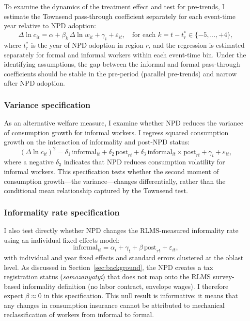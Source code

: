 \documentclass[12pt]{article}
\begin{document}
To examine the dynamics of the treatment effect and test for pre-trends, I estimate the Townsend pass-through coefficient separately for each event-time year relative to NPD adoption:
\begin{equation}\label{eq:eventstudy}
\Delta \ln c_{it} = \alpha + \beta_k \, \Delta \ln w_{it} + \gamma_t + \varepsilon_{it}, \quad \text{for each } k = t - t^*_r \in \{-5, \ldots, +4\},
\end{equation}
where $t^*_r$ is the year of NPD adoption in region $r$, and the regression is estimated separately for formal and informal workers within each event-time bin. Under the identifying assumptions, the gap between the informal and formal pass-through coefficients should be stable in the pre-period (parallel pre-trends) and narrow after NPD adoption.

\subsubsection{Variance specification}

As an alternative welfare measure, I examine whether NPD reduces the variance of consumption growth for informal workers. I regress squared consumption growth on the interaction of informality and post-NPD status:
\begin{equation}\label{eq:variance}
(\Delta \ln c_{it})^2 = \delta_1 \, \text{informal}_{it} + \delta_2 \, \text{post}_{rt} + \delta_3 \, \text{informal}_{it} \times \text{post}_{rt} + \gamma_t + \varepsilon_{it},
\end{equation}
where a negative $\delta_3$ indicates that NPD reduces consumption volatility for informal workers. This specification tests whether the second moment of consumption growth---the variance---changes differentially, rather than the conditional mean relationship captured by the Townsend test.

\subsubsection{Informality rate specification}

I also test directly whether NPD changes the RLMS-measured informality rate using an individual fixed effects model:
\begin{equation}\label{eq:informality}
\text{informal}_{it} = \alpha_i + \gamma_t + \beta \, \text{post}_{rt} + \varepsilon_{it},
\end{equation}
with individual and year fixed effects and standard errors clustered at the oblast level. As discussed in Section~\ref{sec:background}, the NPD creates a tax registration status (\textit{samozanyatyi}) that does not map onto the RLMS survey-based informality definition (no labor contract, envelope wages). I therefore expect $\beta \approx 0$ in this specification. This null result is informative: it means that any changes in consumption insurance cannot be attributed to mechanical reclassification of workers from informal to formal.
\end{document}
